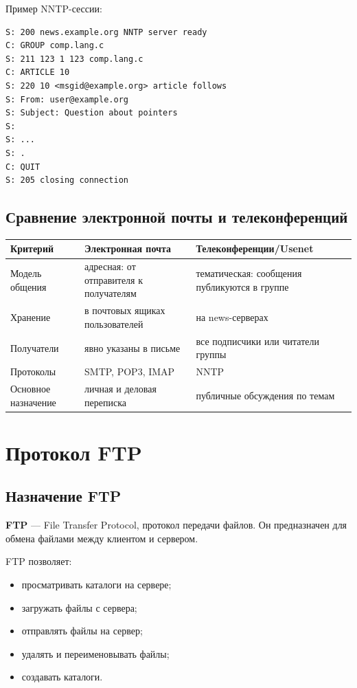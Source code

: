 \documentclass[12pt,a4paper]{article}
\begin{document}
Пример NNTP-сессии:
\begin{lstlisting}
S: 200 news.example.org NNTP server ready
C: GROUP comp.lang.c
S: 211 123 1 123 comp.lang.c
C: ARTICLE 10
S: 220 10 <msgid@example.org> article follows
S: From: user@example.org
S: Subject: Question about pointers
S:
S: ...
S: .
C: QUIT
S: 205 closing connection
\end{lstlisting}

\subsection{Сравнение электронной почты и телеконференций}

\begin{center}
\begin{tabular}{|p{4cm}|p{5cm}|p{5cm}|}
\hline
Критерий & Электронная почта & Телеконференции/Usenet \\
\hline
Модель общения & адресная: от отправителя к получателям & тематическая: сообщения публикуются в группе \\
\hline
Хранение & в почтовых ящиках пользователей & на news-серверах \\
\hline
Получатели & явно указаны в письме & все подписчики или читатели группы \\
\hline
Протоколы & SMTP, POP3, IMAP & NNTP \\
\hline
Основное назначение & личная и деловая переписка & публичные обсуждения по темам \\
\hline
\end{tabular}
\end{center}

\section{Протокол FTP}

\subsection{Назначение FTP}

\textbf{FTP} --- File Transfer Protocol, протокол передачи файлов. Он предназначен для обмена файлами между клиентом и сервером.

FTP позволяет:
\begin{itemize}
    \item просматривать каталоги на сервере;
    \item загружать файлы с сервера;
    \item отправлять файлы на сервер;
    \item удалять и переименовывать файлы;
    \item создавать каталоги.
\end{itemize}
\end{document}
